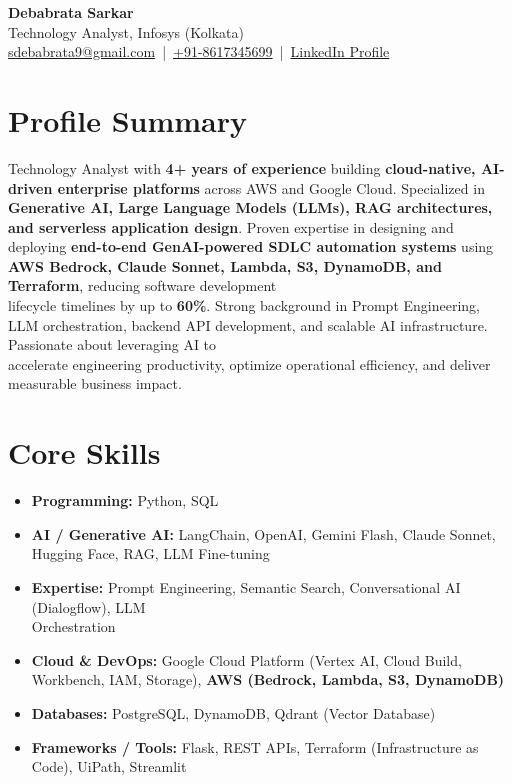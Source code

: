 \documentclass[a4paper,11pt]{article}
\begin{document}
\begin{center}
    {\Huge \bfseries Debabrata Sarkar} \\[12pt]
    Technology Analyst, Infosys (Kolkata) \\[6pt]
    \href{mailto:sdebabrata9@gmail.com}{sdebabrata9@gmail.com} \,|\, 
    \href{tel:+918617345699}{+91-8617345699} \,|\, 
    \href{https://www.linkedin.com/in/debabrata-sarkar-genai/}{LinkedIn Profile}
\end{center}

\vspace{8pt}

\section*{Profile Summary}
Technology Analyst with \textbf{4+ years of experience} building \textbf{cloud-native, AI-driven enterprise platforms} across AWS and Google Cloud. Specialized in \textbf{Generative AI, Large Language Models (LLMs), RAG architectures, and serverless application design}. Proven expertise in designing and deploying \textbf{end-to-end GenAI-powered SDLC automation systems} using \textbf{AWS Bedrock, Claude Sonnet, Lambda, S3, DynamoDB, and Terraform}, reducing software development \\lifecycle timelines by up to \textbf{60\%}. Strong background in Prompt Engineering, LLM orchestration, backend API development, and scalable AI infrastructure. Passionate about leveraging AI to \\accelerate engineering productivity, optimize operational efficiency, and deliver measurable business impact.

\section*{Core Skills}
\begin{itemize}
    \item \textbf{Programming:} Python, SQL
    \item \textbf{AI / Generative AI:} LangChain, OpenAI, Gemini Flash, Claude Sonnet, Hugging Face, RAG, LLM Fine-tuning
    \item \textbf{Expertise:} Prompt Engineering, Semantic Search, Conversational AI (Dialogflow), LLM \\Orchestration
    \item \textbf{Cloud \& DevOps:} Google Cloud Platform (Vertex AI, Cloud Build, Workbench, IAM, Storage), \textbf{AWS (Bedrock, Lambda, S3, DynamoDB)}
    \item \textbf{Databases:} PostgreSQL, DynamoDB, Qdrant (Vector Database)
    \item \textbf{Frameworks / Tools:} Flask, REST APIs, Terraform (Infrastructure as Code), UiPath, Streamlit
\end{itemize}
\end{document}
